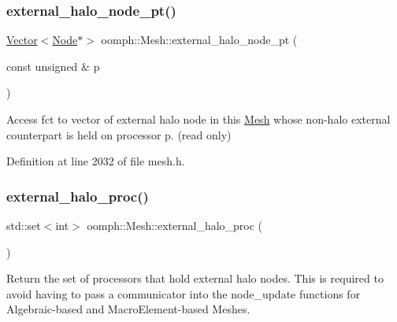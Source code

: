 \mbox{\label{classoomph_1_1Mesh_a06972b46c50a5a3f88a8a87cd1b54807}} 
\subsubsection{\texorpdfstring{external\+\_\+halo\+\_\+node\+\_\+pt()}{external\_halo\_node\_pt()}\hspace{0.1cm}{\footnotesize\ttfamily [2/2]}}
{\footnotesize\ttfamily \hyperlink{classoomph_1_1Vector}{Vector}$<$\hyperlink{classoomph_1_1Node}{Node}$\ast$$>$ oomph\+::\+Mesh\+::external\+\_\+halo\+\_\+node\+\_\+pt (\begin{DoxyParamCaption}\item[{const unsigned \&}]{p }\end{DoxyParamCaption})\hspace{0.3cm}{\ttfamily [inline]}}



Access fct to vector of external halo node in this \hyperlink{classoomph_1_1Mesh}{Mesh} whose non-\/halo external counterpart is held on processor p. (read only) 



Definition at line 2032 of file mesh.\+h.

\mbox{\label{classoomph_1_1Mesh_a71aa1c79867a37d5bde740ad9ddae637}} 
\subsubsection{\texorpdfstring{external\+\_\+halo\+\_\+proc()}{external\_halo\_proc()}}
{\footnotesize\ttfamily std\+::set$<$int$>$ oomph\+::\+Mesh\+::external\+\_\+halo\+\_\+proc (\begin{DoxyParamCaption}{ }\end{DoxyParamCaption})\hspace{0.3cm}{\ttfamily [inline]}}



Return the set of processors that hold external halo nodes. This is required to avoid having to pass a communicator into the node\+\_\+update functions for Algebraic-\/based and Macro\+Element-\/based Meshes. 



